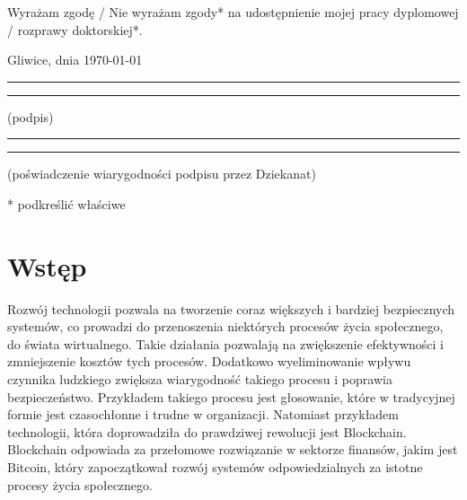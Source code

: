 \documentclass[a4paper,12pt]{book}
\newcounter{stronyPozaNumeracja}
\begin{document}
\vfill

Wyrażam  zgodę / Nie wyrażam zgody*  na  udostępnienie  mojej  pracy  dyplomowej / rozprawy doktorskiej*.

\vfill

Gliwice, dnia \today

\vfill

\rule{0.5\textwidth}{0cm}\dotfill 

\rule{0.5\textwidth}{0cm}
\begin{minipage}{0.45\textwidth}
{\begin{center}(podpis)\end{center}}
\end{minipage} 

\vfill

\rule{0.5\textwidth}{0cm}\dotfill 

\rule{0.5\textwidth}{0cm}
\begin{minipage}{0.45\textwidth}
{\begin{center}\rule{0mm}{5mm}(poświadczenie wiarygodności podpisu przez Dziekanat)\end{center}}
\end{minipage}


\vfill

* podkreślić właściwe

 


\cleardoublepage



\pagestyle{tylkoNumeryStron}
\tableofcontents

\mainmatter
{}
\setcounter{stronyPozaNumeracja}{\value{page}}
\pagestyle{NumeryStronNazwyRozdzialow}


\chapter{Wstęp}

Rozwój technologii pozwala na tworzenie coraz większych i bardziej bezpiecznych systemów, co prowadzi do przenoszenia niektórych procesów życia społecznego, do świata wirtualnego. Takie działania pozwalają na zwiększenie efektywności i zmniejszenie kosztów tych procesów. Dodatkowo wyeliminowanie wpływu czynnika ludzkiego zwiększa wiarygodność takiego procesu i poprawia bezpieczeństwo. Przykładem takiego procesu jest głosowanie, które w tradycyjnej formie jest czasochłonne i trudne w organizacji. Natomiast przykładem technologii, która doprowadziła do prawdziwej rewolucji jest Blockchain. Blockchain odpowiada za przełomowe rozwiązanie w sektorze finansów, jakim jest Bitcoin, który zapoczątkował rozwój systemów odpowiedzialnych za istotne procesy życia społecznego.
\end{document}
